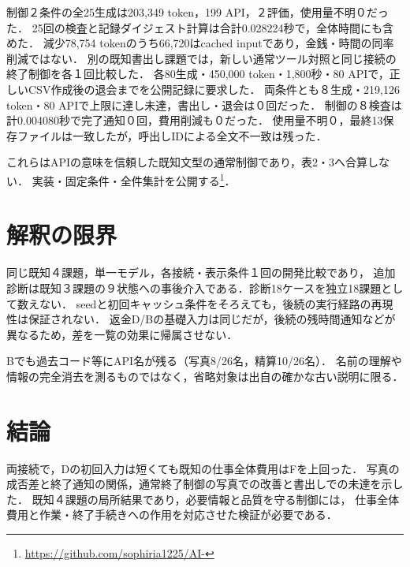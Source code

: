 \documentclass[uplatex,a4paper,twocolumn,10pt]{jsarticle}
\begin{document}
制御２条件の全25生成は203,349 token，199 API，２評価，使用量不明０だった．
25回の検査と記録ダイジェスト計算は合計0.028224秒で，全体時間にも含めた．
減少78,754 tokenのうち66,720はcached inputであり，金銭・時間の同率削減ではない．
別の既知書出し課題では，新しい通常ツール対照と同じ接続の終了制御を各１回比較した．
各80生成・450,000 token・1,800秒・80 APIで，正しいCSV作成後の退会までを公開記録に要求した．
両条件とも８生成・219,126 token・80 APIで上限に達し未達，書出し・退会は０回だった．
制御の８検査は計0.004080秒で完了通知０回，費用削減も０だった．
使用量不明０，最終13保存ファイルは一致したが，呼出しIDによる全文不一致は残った．

これらはAPIの意味を信頼した既知文型の通常制御であり，表2・3へ合算しない．
実装・固定条件・全件集計を公開する\footnote{\url{https://github.com/sophiria1225/AI-}}．

\section{解釈の限界}
同じ既知４課題，単一モデル，各接続・表示条件１回の開発比較であり，
追加診断は既知３課題の９状態への事後介入である．診断18ケースを独立18課題として数えない．
seedと初回キャッシュ条件をそろえても，後続の実行経路の再現性は保証されない．
返金D/Bの基礎入力は同じだが，後続の残時間通知などが異なるため，差を一覧の効果に帰属させない．

Bでも過去コード等にAPI名が残る（写真8/26名，精算10/26名）．
名前の理解や情報の完全消去を測るものではなく，省略対象は出自の確かな古い説明に限る．

\section{結論}
両接続で，Dの初回入力は短くても既知の仕事全体費用はFを上回った．
写真の成否差と終了通知の関係，通常終了制御の写真での改善と書出しでの未達を示した．
既知４課題の局所結果であり，必要情報と品質を守る制御には，
仕事全体費用と作業・終了手続きへの作用を対応させた検証が必要である．



\end{document}
